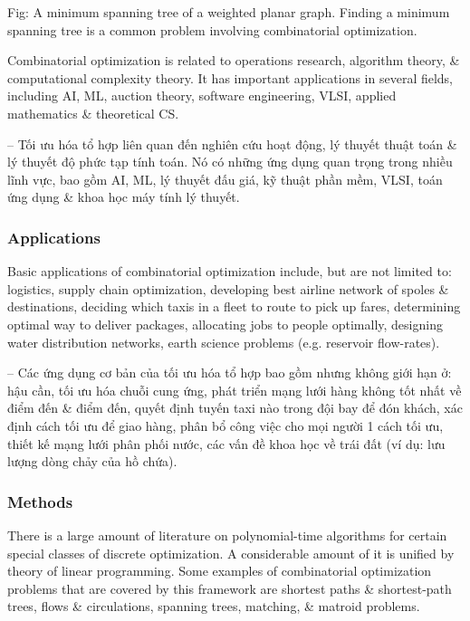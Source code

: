 \documentclass{article}
\begin{document}
{\sf Fig: A minimum spanning tree of a weighted planar graph. Finding a minimum spanning tree is a common problem involving combinatorial optimization.}

Combinatorial optimization is related to operations research, algorithm theory, \& computational complexity theory. It has important applications in several fields, including AI, ML, auction theory, software engineering, VLSI, applied mathematics \& theoretical CS.

-- Tối ưu hóa tổ hợp liên quan đến nghiên cứu hoạt động, lý thuyết thuật toán \& lý thuyết độ phức tạp tính toán. Nó có những ứng dụng quan trọng trong nhiều lĩnh vực, bao gồm AI, ML, lý thuyết đấu giá, kỹ thuật phần mềm, VLSI, toán ứng dụng \& khoa học máy tính lý thuyết.


\subsubsection{Applications}
Basic applications of combinatorial optimization include, but are not limited to: logistics, supply chain optimization, developing best airline network of spoles \& destinations, deciding which taxis in a fleet to route to pick up fares, determining optimal way to deliver packages, allocating jobs to people optimally, designing water distribution networks, earth science problems (e.g. reservoir flow-rates).

-- Các ứng dụng cơ bản của tối ưu hóa tổ hợp bao gồm nhưng không giới hạn ở: hậu cần, tối ưu hóa chuỗi cung ứng, phát triển mạng lưới hàng không tốt nhất về điểm đến \& điểm đến, quyết định tuyến taxi nào trong đội bay để đón khách, xác định cách tối ưu để giao hàng, phân bổ công việc cho mọi người 1 cách tối ưu, thiết kế mạng lưới phân phối nước, các vấn đề khoa học về trái đất (ví dụ: lưu lượng dòng chảy của hồ chứa).


\subsubsection{Methods}
There is a large amount of literature on polynomial-time algorithms for certain special classes of discrete optimization. A considerable amount of it is unified by theory of linear programming. Some examples of combinatorial optimization problems that are covered by this framework are shortest paths \& shortest-path trees, flows \& circulations, spanning trees, matching, \& matroid problems.
\end{document}
